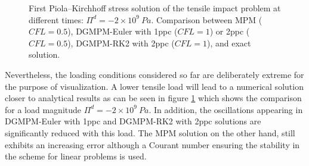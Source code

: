 \begin{figure}[h!]
  \centering
  {}
  \caption{First Piola–Kirchhoff stress solution of the tensile impact problem at different times: $\Pi^d=-2\times 10^{9} \: Pa$. Comparison between MPM ($CFL=0.5$), DGMPM-Euler with 1ppc ($CFL=1$) or 2ppc ($CFL=0.5$), DGMPM-RK2 with 2ppc ($CFL=1$), and exact solution.}
  \label{fig:he_low_shock}
\end{figure}
Nevertheless, the loading conditions considered so far are deliberately extreme for the purpose of visualization. A lower tensile load will lead to a numerical solution closer to analytical results as can be seen in figure \ref{fig:he_low_shock} which shows the comparison for a load magnitude $\Pi^d=-2\times 10^{9} \: Pa$. In addition, the oscillations appearing in DGMPM-Euler with 1ppc and DGMPM-RK2 with 2ppc solutions are significantly reduced with this load. The MPM solution on the other hand, still exhibits an increasing error although a Courant number ensuring the stability in the scheme for linear problems is used.




